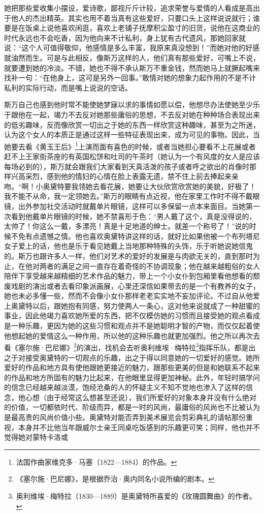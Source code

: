 \par 她把那些爱收集小摆设，爱诗歌，鄙视斤斤计较，追求荣誉与爱情的人看成是高出于他人的杰出精英。其实也用不着当真有这些爱好，只要口头上这样说说就行；谁要是在饭桌上说他喜欢闲逛，喜欢上老铺子抚摩积尘盈寸的旧货，说他在这商业的时代永远也不会吃香，因为他向来不计私利，身上犹有古代遗风，那她回家就说：“这个人可值得敬仰，他感情是多么丰富，我原来真没想到！”而她对他的好感就油然而生。可是与此相反，像斯万这样的人，他们真有那些爱好，可嘴上不说，就要遭到她的冷淡。不错，她也不得不承认斯万不重金钱，然而她马上就撅起嘴来找补一句：“在他身上，这可是另外一回事。”敢情对她的想象力起作用的不是不计私利的实际行动，而是嘴上说说的空话。
\par 斯万自己也感到他时常不能使她梦寐以求的事情如愿以偿，他想尽办法使她至少乐于跟他在一起，竭力不去反对她那些庸俗的思想，不去反对她在种种场合表现出来的低劣趣味，反而像欣赏一切出之于她的东西一样欣赏这种趣味，甚至为之所迷，认为这个女人的本质正是通过这样一些特征表现出来，成为可见的事物。因此，当她要去看《黄玉王后》\footnote{法国作曲家维克多·马塞（1822—1884）的作品。}上演而面有喜色的时候，或者当她担心要看不上花展或者赶不上王家街茶座的有英国松饼和吐司的午茶时（她认为一个有风度的女人是应该每场必到的），斯万就会跟我们大家看到天真活泼的孩子或者呼之欲出的肖像时那样兴高采烈，感到他的情妇的心情在脸上表露无遗，禁不住上前去捧起来亲吻。“啊！小奥黛特要我领她去看花展，她要让大伙欣赏欣赏她的美貌，好极了！我不能不从命，我一定领她去。”斯万的眼睛有点近视，他在家里工作时不得不戴眼镜，出外参加社交活动时就戴单片眼镜，这样可以多保留一点本来面目。当她第一次看到他戴单片眼镜的时候，她不禁喜形于色：“男人戴了这个，真是没得说的，太帅了！你这么一戴，多漂亮！真是十足地道的绅士。就差一个称号了！”说的时候不免有点遗憾之情。他也喜欢奥黛特讲这样的话，就好比如果他被一个布列塔尼女子爱上的话，他也是乐于看见她戴上当地那种特殊的头饰，乐于听她说她信鬼的。斯万也跟许多人一样，他们对艺术的爱好的发展是与肉欲无关的，直到那时为止，在他对两者的满足之间一直存在着奇怪的不协调现象；他在越来越粗俗的女人陪伴下享受越来越精细的艺术作品的魅力，带上一个小女仆到包厢里看他想看的颓废戏剧的演出或者去看印象派画展，心里还深信如果带去的是一个有教养的女子，她也未必多懂一些，然而不会像小女仆那样老老实实地不妄加评论。不过自从他爱上奥黛特以后，跟她抱有同感，努力使两人一条心，这对他来说就成了一种甜蜜的事业，因此他竭力喜欢她所爱的东西，把不仅模仿她的习惯而且接受她的观点看成是一种乐趣，更因为她的这些习惯和观点并不是她聪明才智的产物，而仅仅起着使他想起她的爱情这么一种作用，所以他的这种乐趣也就更加强烈。他之所以再次去看《塞尔施·巴尼娜》\footnote{《塞尔施·巴尼娜》，是根据乔治·奥内同名小说所编的剧本。}的演出，找机会去听奥利维埃·梅特拉\footnote{奥利维埃·梅特拉（1830—1889）是奥黛特所喜爱的《玫瑰圆舞曲》的作者。}指挥乐队，都是出之于对接受奥黛特的一切观点的乐趣，出之于得以同意她的一切爱好的感觉。她所爱好的作品和地方具有使他跟她更接近的魅力，跟那些更美的但是和她联系不起来的作品和地方所固有的魅力比起来，在他眼里显得更加神秘。此外，年轻时搞学问的信念已经越来越淡漠，饱经沧桑的人的怀疑主义不知不觉地也渗入了这样的信念，他心想（由于经常这么想甚至还说），我们所爱好的对象本身并没有什么绝对的价值，一切都依时代、阶级而异，都是一时的风尚，最庸俗的风尚也不比被认为是最高贵的风尚价值小些。奥黛特对能否弄到美术展览会剪彩典礼的请帖那份重视，本身并不比他当年跟威尔士亲王同桌吃饭感到的乐趣更可笑；同样，他也并不觉得她对蒙特卡洛或